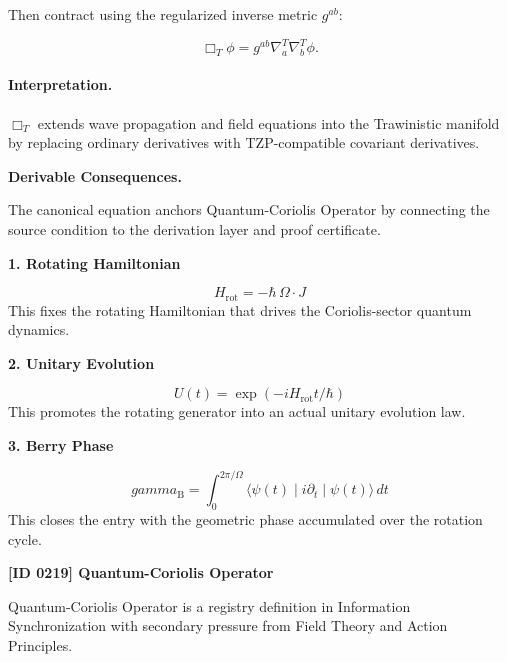 Then contract using the regularized inverse metric $g^{ab}$:

\begin{equation}
\Box_T\phi
=
g^{ab}
\nabla^{T}_{a}
\nabla^{T}_{b}
\phi .
\end{equation}

\paragraph{Interpretation.}
$\Box_T$ extends wave propagation and field equations into the Trawinistic manifold by replacing ordinary derivatives with TZP-compatible covariant derivatives.

\par\vspace{0.35em}
\noindent\textbf{Derivable Consequences.}\quad
\begingroup
\footnotesize
\raggedright
The canonical equation anchors Quantum-Coriolis Operator by connecting the source condition to the derivation layer and proof certificate.
\par\endgroup

\noindent\textbf{1. Rotating Hamiltonian}\par
\[
H_{\mathrm{rot}} = -\hbar\,\Omega\!\cdot\!J
\]
\noindent This fixes the rotating Hamiltonian that drives the Coriolis-sector quantum dynamics.\par
\noindent\textbf{2. Unitary Evolution}\par
\[
U(t) = \exp\!\left(-i H_{\mathrm{rot}} t/\hbar\right)
\]
\noindent This promotes the rotating generator into an actual unitary evolution law.\par
\noindent\textbf{3. Berry Phase}\par
\[
gamma_{\mathrm{B}} = \int_{0}^{2\pi/\Omega}\langle \psi(t)\mid i\partial_t \mid \psi(t)\rangle\,dt
\]
\noindent This closes the entry with the geometric phase accumulated over the rotation cycle.\par

\clearpage
\noindent\textbf{[ID 0219] Quantum-Coriolis Operator}\par
\vspace{0.35em}
\begingroup\small
{}
Quantum-Coriolis Operator is a registry definition in Information Synchronization with secondary pressure from Field Theory and Action Principles.

